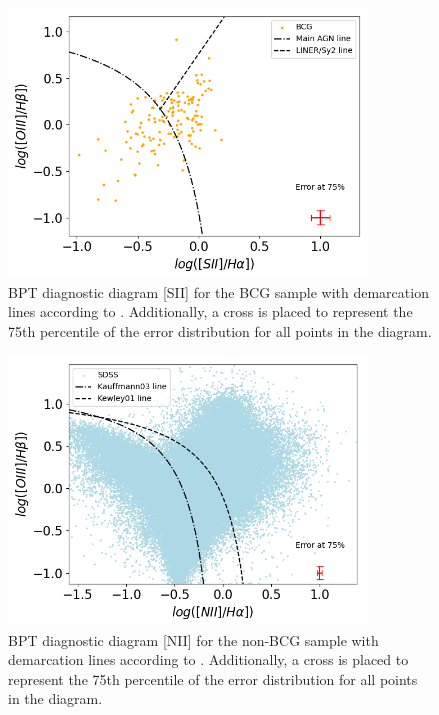\begin{figure}[hbtp]
  \centering
  \includegraphics[width=0.85\textwidth]{BCG-SII1731-V22}
  \caption{BPT diagnostic diagram [SII] for the BCG sample with demarcation lines according to \cite{2006MNRAS.372..961K}.
  Additionally, a cross is placed to represent the 75th percentile of the error distribution for all points in the diagram. }
  \label{5}
\end{figure}


\begin{figure}[hbtp]
  \centering
  \includegraphics[width=0.85\textwidth]{SDSS-NII-V22}
  \caption{BPT diagnostic diagram [NII] for the non-BCG sample with demarcation lines according to \cite{2006MNRAS.372..961K}.
  Additionally, a cross is placed to represent the 75th percentile of the error distribution for all points in the diagram. }
  \label{6}
\end{figure}

